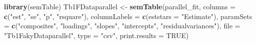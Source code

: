 \documentclass[
  11pt,
]{book}
\newenvironment{Shaded}{\begin{snugshade}}{\end{snugshade}}
\newcommand{\AttributeTok}[1]{\textcolor[rgb]{0.27,0.27,0.27}{#1}}
\newcommand{\ConstantTok}[1]{\textcolor[rgb]{0.37,0.37,0.37}{#1}}
\newcommand{\FunctionTok}[1]{\textcolor[rgb]{0.27,0.27,0.27}{\textbf{#1}}}
\newcommand{\NormalTok}[1]{#1}
\newcommand{\OtherTok}[1]{\textcolor[rgb]{0.37,0.37,0.37}{#1}}
\newcommand{\StringTok}[1]{\textcolor[rgb]{0.5,0.5,0.5}{#1}}
\begin{document}
\begin{Shaded}
\begin{Highlighting}[]
\FunctionTok{library}\NormalTok{(semTable)}
\NormalTok{Tb1FDataparallel }\OtherTok{\textless{}{-}} \FunctionTok{semTable}\NormalTok{(parallel\_fit, }\AttributeTok{columns =} \FunctionTok{c}\NormalTok{(}\StringTok{"est"}\NormalTok{, }\StringTok{"se"}\NormalTok{, }\StringTok{"p"}\NormalTok{,}
    \StringTok{"rsquare"}\NormalTok{), }\AttributeTok{columnLabels =} \FunctionTok{c}\NormalTok{(}\AttributeTok{eststars =} \StringTok{"Estimate"}\NormalTok{), }\AttributeTok{paramSets =} \FunctionTok{c}\NormalTok{(}\StringTok{"composites"}\NormalTok{,}
    \StringTok{"loadings"}\NormalTok{, }\StringTok{"slopes"}\NormalTok{, }\StringTok{"intercepts"}\NormalTok{, }\StringTok{"residualvariances"}\NormalTok{), }\AttributeTok{file =} \StringTok{"Tb1FakyDataparallel"}\NormalTok{,}
    \AttributeTok{type =} \StringTok{"csv"}\NormalTok{, }\AttributeTok{print.results =} \ConstantTok{TRUE}\NormalTok{)}
\end{Highlighting}
\end{Shaded}
\end{document}
